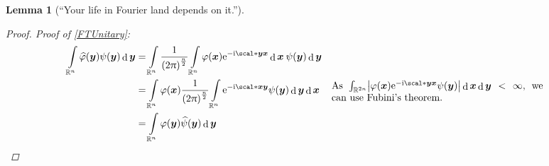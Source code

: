 \documentclass[10pt]{article}
\newtheorem*{lemma}{Lemma}
\DeclarePairedDelimiter\abs{\lvert}{\rvert}
\DeclarePairedDelimiter\of{\lparen}{\rparen}
\newcommand{\R}{\mathbb{R}}
\newcommand{\Rn}{{\R^n}}
\DeclareMathOperator{\diffd}{d}
\newcommand\gj\varphi
\newcommand\gy\psi
\newcommand{\bx}{{\vectorsym x}}
\newcommand{\by}{{\vectorsym y}}
\newcommand\ft\widehat
\newcommand\Int[1]{\int\limits_#1}
\newcommand\commentbox[1]{\parbox{7.5cm}{#1}}
\newcommand\I{\mathrm{i}}
\newcommand\E{\mathrm{e}}
\begin{document}
\begin{lemma}[``Your life in Fourier land depends on it.'']
\begin{proof}
      Proof of \ref{FTUnitary}:
      \begin{align*}
        \Int\Rn\ft\gj\of*\by \gy\of*\by \diffd\by
        &= \Int\Rn\frac{1}{\of*{2\pi}^\frac{n}{2}}\Int\Rn\gj\of*\bx
          \E^{-\I\scal*\by\bx}\diffd\bx\:\gy\of*\by\diffd\by \\
        &= \Int\Rn\gj\of*\bx\frac{1}{\of*{2\pi}^\frac{n}{2}}\Int\Rn
          \E^{-\I\scal*\bx\by}\gy\of*\by\diffd\by\diffd\bx
          && \commentbox{As $\int_{\R^{2n}}\abs*{\gj\of*\bx
          \E^{-\I\scal*\by\bx}\gy\of*\by}\diffd\bx\diffd\by<\infty$,
          we can use Fubini's theorem.} \\
        &=\Int\Rn\gj\of*\by \ft\gy\of*\by \diffd\by
      \end{align*}
      
      
    \end{proof}
  \end{lemma}
  
\end{document}
